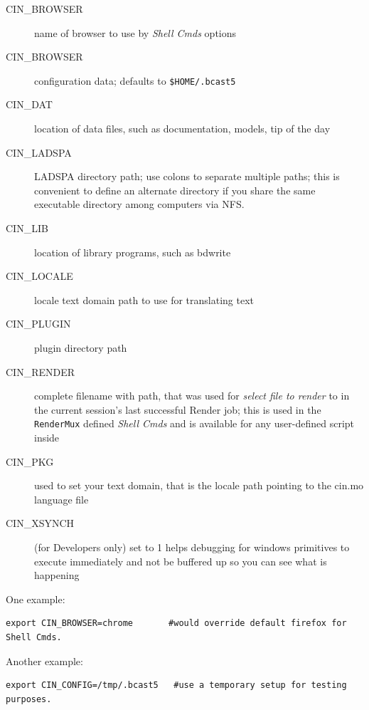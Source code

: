 \begin{description}
    \item[{\small CIN\_BROWSER}] name of browser to use by \textit{Shell Cmds} options
    \item[{\small CIN\_BROWSER}] configuration data; defaults to \texttt{\$HOME/.bcast5}
    \item[{\small CIN\_DAT}] location of data files, such as documentation, models, tip of the day
    \item[{\small CIN\_LADSPA}] LADSPA directory path; use colons to separate multiple paths; this is convenient to define an alternate directory if you share the same executable directory among computers via NFS.
    \item[{\small CIN\_LIB}] location of library programs, such as bdwrite
    \item[{\small CIN\_LOCALE}] locale text domain path to use for translating text
    \item[{\small CIN\_PLUGIN}] plugin directory path
    \item[{\small CIN\_RENDER}] complete filename with path, that was used for \textit{select file to render} to in the current session’s last successful Render job; this is used in the \texttt{RenderMux} defined \textit{Shell Cmds} and is available for any user-defined script inside \CGG{}
    \item[{\small CIN\_PKG}] used to set your text domain, that is the locale path pointing to the cin.mo language file
    \item[{\small CIN\_XSYNCH}] (for Developers only) set to 1 helps debugging for windows primitives to execute immediately and not be buffered up so you can see what is happening
\end{description}

One example:

\begin{lstlisting}[numbers=none]
export CIN_BROWSER=chrome       #would override default firefox for Shell Cmds.
\end{lstlisting}

Another example:

\begin{lstlisting}[numbers=none]
export CIN_CONFIG=/tmp/.bcast5   #use a temporary setup for testing purposes.
\end{lstlisting}

